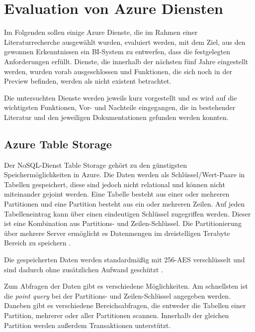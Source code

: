 \section{Evaluation von Azure Diensten} \label{sec:evaluation}
Im Folgenden sollen einige Azure Dienste, die im Rahmen einer Literaturrecherche ausgewählt wurden, evaluiert werden, mit dem Ziel, aus den gewonnen Erkenntnissen ein BI-System zu entwerfen, dass die festgelegten Anforderungen erfüllt. Dienste, die innerhalb der nächsten fünf Jahre eingestellt werden, wurden vorab ausgeschlossen und Funktionen, die sich noch in der Preview befinden, werden als nicht existent betrachtet. 

Die untersuchten Dienste werden jeweils kurz vorgestellt und es wird auf die wichtigsten Funktionen, Vor- und Nachteile eingegangen, die in bestehender Literatur und den jeweiligen Dokumentationen gefunden werden konnten.


\subsection{Azure Table Storage} \label{sec:grundlagen:azure_dienste:tableStorage}
Der NoSQL-Dienst Table Storage gehört zu den günstigsten Speichermöglichkeiten in Azure. Die Daten werden als Schlüssel/Wert-Paare in Tabellen gespeichert, diese sind jedoch nicht relational und können nicht miteinander gejoint werden. Eine Tabelle besteht aus einer oder mehreren Partitionen und eine Partition besteht aus ein oder mehreren Zeilen. Auf jeden Tabelleneintrag kann über einen eindeutigen Schlüssel zugegriffen werden. Dieser ist eine Kombination aus Partitions- und Zeilen-Schlüssel. Die Partitionierung über mehrere Server ermöglicht es Datenmengen im dreistelligen Terabyte Bereich zu speichern \cite{reagan_web_2018}.

Die gespeicherten Daten werden standardmäßig mit 256-AES verschlüsselt und sind dadurch ohne zusätzlichen Aufwand geschützt \cite{soh_microsoft_2020}. 

Zum Abfragen der Daten gibt es verschiedene Möglichkeiten. Am schnellsten ist die \textit{point query} bei der Partitions- und Zeilen-Schlüssel angegeben werden. Daneben gibt es verschiedene Bereichsabfragen, die entweder die Tabellen einer Partition, mehrerer oder aller Partitionen scannen. Innerhalb der gleichen Partition werden außerdem Transaktionen unterstützt.

